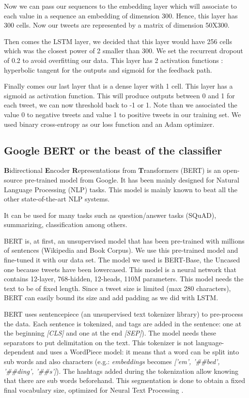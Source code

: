 \documentclass[letterpaper, 10 pt, conference]{ieeeconf}  %
\begin{document}
Now we can pass our sequences to the embedding layer which will associate to each value in a sequence an embedding of dimension 300. Hence, this layer has 300 cells. Now our tweets are represented by a matrix of dimension 50X300. 

Then comes the LSTM layer, we decided that this layer would have 256 cells which was the closest power of 2 smaller than 300. We set the recurrent dropout of 0.2 to avoid overfitting our data. This layer has 2 activation functions : hyperbolic tangent for the outputs and sigmoid for the feedback path.

Finally comes our last layer that is a dense layer with 1 cell. This layer has a sigmoid as activation function. This will produce outputs between 0 and 1 for each tweet, we can now threshold back to -1 or 1. Note than we associated the value 0 to negative tweets and value 1 to positive tweets in our training set. We used binary cross-entropy as our loss function and an Adam optimizer.

\subsection{Google BERT or the beast of the classifier}
    
\textbf{B}idirectional \textbf{E}ncoder \textbf{R}epresentations from \textbf{T}ransformers (BERT) is an open-source pre-trained model from Google. It has been mainly designed for Natural Language Processing (NLP) tasks. This model is mainly known to beat all the other state-of-the-art NLP systems.

It can be used for many tasks such as question/answer tasks (SQuAD), summarizing, classification among others. 

BERT\cite{BERT_paper} is, at first, an unsupervised model that has been pre-trained with millions of sentences (Wikipedia and Book Corpus). We use this pre-trained model and fine-tuned it with our data set. 
The model we used is BERT-Base, the Uncased one because tweets have been lowercased. This model is a neural network that contains 12-layer, 768-hidden, 12-heads, 110M parameters.
This model needs the text to be of fixed length. Since a tweet size is limited (max 280 characters), BERT can easily bound its size and add padding as we did with LSTM.

BERT uses sentencepiece (an unsupervised text tokenizer library) to pre-process the data. Each sentence is tokenized, and tags are added in the sentence: one at the beginning \textit{[CLS]} and one at the end \textit{[SEP]}). The model needs these separators to put delimitation on the text. 
This tokenizer is not language-dependent and uses a WordPiece model: it means that a word can be split into sub words and also characters (e.g.: \textit{embeddings} becomes \textit{['em', '\#\#bed', '\#\#ding', '\#\#s']}). The hashtags added during the tokenization allow knowing that there are sub words beforehand. 
This segmentation is done to obtain a fixed final vocabulary size, optimized for Neural Text Processing \cite{BERT_preprocessing}. 
\end{document}
